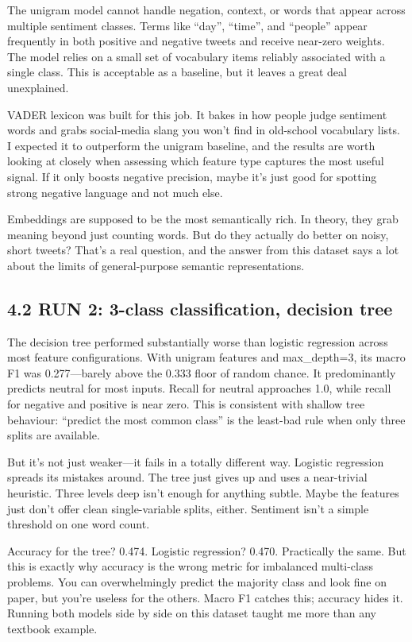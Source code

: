\documentclass[12pt]{article}
\begin{document}
The unigram model cannot handle negation, context, or words that appear across multiple sentiment classes. Terms like ``day'', ``time'', and ``people'' appear frequently in both positive and negative tweets and receive near-zero weights. The model relies on a small set of vocabulary items reliably associated with a single class. This is acceptable as a baseline, but it leaves a great deal unexplained.

VADER lexicon was built for this job. It bakes in how people judge sentiment words and grabs social-media slang you won't find in old-school vocabulary lists. I expected it to outperform the unigram baseline, and the results are worth looking at closely when assessing which feature type captures the most useful signal. If it only boosts negative precision, maybe it's just good for spotting strong negative language and not much else.

Embeddings are supposed to be the most semantically rich. In theory, they grab meaning beyond just counting words. But do they actually do better on noisy, short tweets? That's a real question, and the answer from this dataset says a lot about the limits of general-purpose semantic representations.



\subsection*{4.2 RUN 2: 3-class classification, decision tree}



The decision tree performed substantially worse than logistic regression across most feature configurations. With unigram features and max\_depth=3, its macro F1 was 0.277---barely above the 0.333 floor of random chance. It predominantly predicts neutral for most inputs. Recall for neutral approaches 1.0, while recall for negative and positive is near zero. This is consistent with shallow tree behaviour: ``predict the most common class'' is the least-bad rule when only three splits are available.

But it's not just weaker---it fails in a totally different way. Logistic regression spreads its mistakes around. The tree just gives up and uses a near-trivial heuristic. Three levels deep isn't enough for anything subtle. Maybe the features just don't offer clean single-variable splits, either. Sentiment isn't a simple threshold on one word count.

Accuracy for the tree? 0.474. Logistic regression? 0.470. Practically the same. But this is exactly why accuracy is the wrong metric for imbalanced multi-class problems. You can overwhelmingly predict the majority class and look fine on paper, but you're useless for the others. Macro F1 catches this; accuracy hides it. Running both models side by side on this dataset taught me more than any textbook example.
\end{document}
